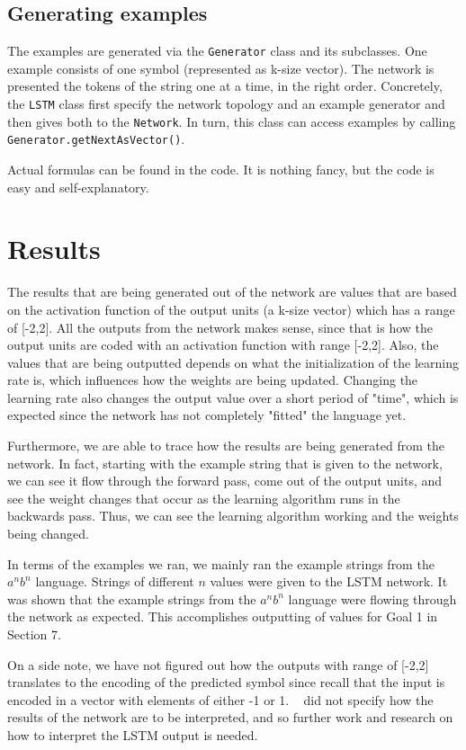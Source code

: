 \documentclass[11pt,letterpaper]{article}
\begin{document}
	\subsection{Generating examples}
	The examples are generated via the \verb!Generator! class and its subclasses. One example consists of one symbol (represented as k-size vector). The network is presented the tokens of the string one at a time, in the right order. Concretely, the \verb!LSTM! class first specify the network topology and an example generator and then gives both to the \verb!Network!. In turn, this class can access examples by calling \verb!Generator.getNextAsVector()!.

	Actual formulas can be found in the code. It is nothing fancy, but the code is easy and self-explanatory.

	\section{Results}
	The results that are being generated out of the network are values that are based on the activation function of the output units (a k-size vector) which has a range of [-2,2]. All the outputs from the network makes sense, since that is how the output units are coded with an activation function with range [-2,2]. Also, the values that are being outputted depends on what the initialization of the learning rate is, which influences how the weights are being updated. Changing the learning rate also changes the output value over a short period of "time", which is expected since the network has not completely "fitted" the language yet.

	Furthermore, we are able to trace how the results are being generated from the network. In fact, starting with the example string that is given to the network, we can see it flow through the forward pass, come out of the output units, and see the weight changes that occur as the learning algorithm runs in the backwards pass. Thus, we can see the learning algorithm working and the weights being changed.

	In terms of the examples we ran, we mainly ran the example strings from the $a^nb^n$ language. Strings of different $n$ values were given to the LSTM network. It was shown that the example strings from the $a^nb^n$ language were flowing through the network as expected. This accomplishes outputting of values for Goal 1 in Section 7.

	On a side note, we have not figured out how the outputs with range of [-2,2] translates to the encoding of the predicted symbol since recall that the input is encoded in a vector with elements of either -1 or 1. ~\cite{Gers:01} did not specify how the results of the network are to be interpreted, and so further work and research on how to interpret the LSTM output is needed.
\end{document}
